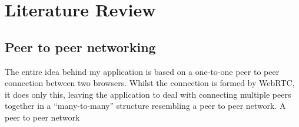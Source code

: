 \documentclass[]{report}
\begin{document}
	\section{Literature Review}
		\subsection*{Peer to peer networking}
		The entire idea behind my application is based on a one-to-one peer to peer connection between two browsers. Whilst the connection is formed by WebRTC, it does only this, leaving the application to deal with connecting multiple peers together in a “many-to-many” structure resembling a peer to peer network.
		A peer to peer network 
\end{document}
